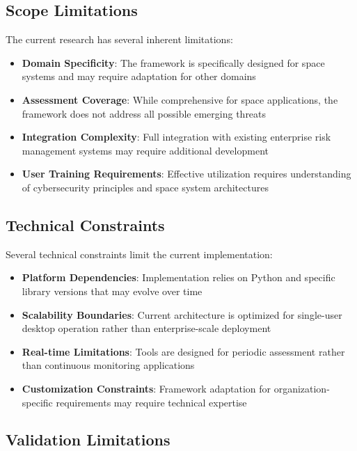 \documentclass[binding=0.6cm]{sapthesis}
\begin{document}
\subsection{Scope Limitations}

The current research has several inherent limitations:

\begin{itemize}
    \item \textbf{Domain Specificity}: The framework is specifically designed for space systems and may require adaptation for other domains
    \item \textbf{Assessment Coverage}: While comprehensive for space applications, the framework does not address all possible emerging threats
    \item \textbf{Integration Complexity}: Full integration with existing enterprise risk management systems may require additional development
    \item \textbf{User Training Requirements}: Effective utilization requires understanding of cybersecurity principles and space system architectures
\end{itemize}

\subsection{Technical Constraints}

Several technical constraints limit the current implementation:

\begin{itemize}
    \item \textbf{Platform Dependencies}: Implementation relies on Python and specific library versions that may evolve over time
    \item \textbf{Scalability Boundaries}: Current architecture is optimized for single-user desktop operation rather than enterprise-scale deployment
    \item \textbf{Real-time Limitations}: Tools are designed for periodic assessment rather than continuous monitoring applications
    \item \textbf{Customization Constraints}: Framework adaptation for organization-specific requirements may require technical expertise
\end{itemize}

\subsection{Validation Limitations}
\end{document}
